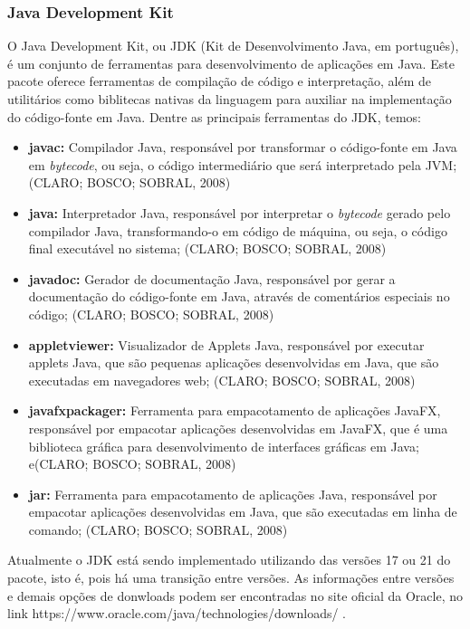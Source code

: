 \documentclass[a4paper,12pt]{article}
\begin{document}
\subsubsection{Java Development Kit}
O Java Development Kit, ou JDK (Kit de Desenvolvimento Java, em português), é um conjunto de ferramentas para desenvolvimento de aplicações em Java. Este pacote oferece ferramentas 
de compilação de código e interpretação, além de utilitários como biblitecas nativas da linguagem para auxiliar na implementação do código-fonte em Java. Dentre as principais ferramentas do JDK, temos:
\begin{itemize}
	\item \textbf{javac:} Compilador Java, responsável por transformar o código-fonte em Java em \textit{bytecode}, ou seja, o código intermediário que será interpretado pela JVM; (CLARO; BOSCO; SOBRAL, 2008)
	\item \textbf{java:} Interpretador Java, responsável por interpretar o \textit{bytecode} gerado pelo compilador Java, transformando-o em código de máquina, ou seja, o código final executável no sistema; (CLARO; BOSCO; SOBRAL, 2008)
	\item \textbf{javadoc:} Gerador de documentação Java, responsável por gerar a documentação do código-fonte em Java, através de comentários especiais no código; (CLARO; BOSCO; SOBRAL, 2008)
	\item \textbf{appletviewer:} Visualizador de Applets Java, responsável por executar applets Java, que são pequenas aplicações desenvolvidas em Java, que são executadas em navegadores web; (CLARO; BOSCO; SOBRAL, 2008)
	\item \textbf{javafxpackager:} Ferramenta para empacotamento de aplicações JavaFX, responsável por empacotar aplicações desenvolvidas em JavaFX, que é uma biblioteca gráfica para desenvolvimento de interfaces gráficas em Java; e(CLARO; BOSCO; SOBRAL, 2008)
	\item \textbf{jar:} Ferramenta para empacotamento de aplicações Java, responsável por empacotar aplicações desenvolvidas em Java, que são executadas em linha de comando; (CLARO; BOSCO; SOBRAL, 2008)
\end{itemize}

Atualmente o JDK está sendo implementado utilizando das versões 17 ou 21 do pacote, isto é, pois há uma transição entre versões. As informações entre versões e demais opções de donwloads 
podem ser encontradas no site oficial da Oracle, no link https://www.oracle.com/java/technologies/downloads/ .
\end{document}
